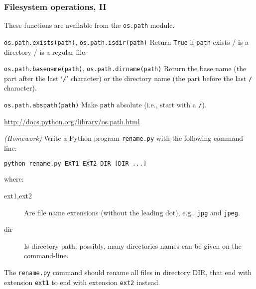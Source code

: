\documentclass[english,serif,mathserif,xcolor=pdftex,dvipsnames,table]{beamer}
\begin{document}
\begin{frame}[fragile]
  \frametitle{Filesystem operations, II}
  These functions are available from the \texttt{os.path} module.

  \begin{describe}{\lstinline|os.path.exists(path)|, 
      \lstinline|os.path.isdir(path)|}
    Return \texttt{True} if \texttt{path} exists / is a directory / is
    a regular file.
  \end{describe}
  
  \begin{describe}{\lstinline|os.path.basename(path)|, 
      \lstinline|os.path.dirname(path)|}
    Return the base name (the part after the last `\texttt{/}'
    character) or the directory name (the part before the last
    \texttt{/} character).
  \end{describe}
  
  \begin{describe}{\lstinline|os.path.abspath(path)|}
    Make \texttt{path} absolute (i.e., start with a \texttt{/}).
  \end{describe}
  
  \begin{references}
    \url{http://docs.python.org/library/os.path.html}
  \end{references}
\end{frame}


\begin{frame}[fragile]
  \begin{exercise}\emph{(Homework)}
    Write a Python program \texttt{rename.py} with the following
    command-line:
\begin{lstlisting}[language=sh]
python rename.py EXT1 EXT2 DIR [DIR ...]
\end{lstlisting}
    where:
    \begin{description}
    \item[ext1,ext2] Are file name extensions (without the leading
      dot), e.g., \texttt{jpg} and \texttt{jpeg}.
    \item[dir] Is directory path; possibly, many directories names can
      be given on the command-line.
    \end{description}

    The \texttt{rename.py} command should rename all files in
    directory DIR, that end with extension \texttt{ext1} to end with
    extension \texttt{ext2} instead.
  \end{exercise}
\end{frame}
\end{document}
